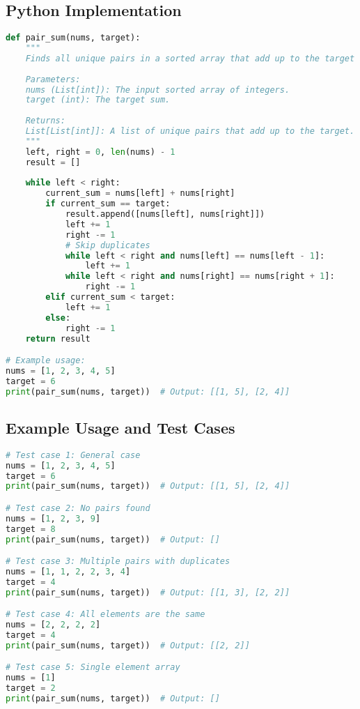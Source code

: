 \subsection*{Python Implementation}
\begin{fullwidth}
\begin{lstlisting}[language=Python]
def pair_sum(nums, target):
    """
    Finds all unique pairs in a sorted array that add up to the target sum.
    
    Parameters:
    nums (List[int]): The input sorted array of integers.
    target (int): The target sum.
    
    Returns:
    List[List[int]]: A list of unique pairs that add up to the target.
    """
    left, right = 0, len(nums) - 1
    result = []
    
    while left < right:
        current_sum = nums[left] + nums[right]
        if current_sum == target:
            result.append([nums[left], nums[right]])
            left += 1
            right -= 1
            # Skip duplicates
            while left < right and nums[left] == nums[left - 1]:
                left += 1
            while left < right and nums[right] == nums[right + 1]:
                right -= 1
        elif current_sum < target:
            left += 1
        else:
            right -= 1
    return result

# Example usage:
nums = [1, 2, 3, 4, 5]
target = 6
print(pair_sum(nums, target))  # Output: [[1, 5], [2, 4]]
\end{lstlisting}
\end{fullwidth}

\subsection*{Example Usage and Test Cases}

\begin{lstlisting}[language=Python]
# Test case 1: General case
nums = [1, 2, 3, 4, 5]
target = 6
print(pair_sum(nums, target))  # Output: [[1, 5], [2, 4]]

# Test case 2: No pairs found
nums = [1, 2, 3, 9]
target = 8
print(pair_sum(nums, target))  # Output: []

# Test case 3: Multiple pairs with duplicates
nums = [1, 1, 2, 2, 3, 4]
target = 4
print(pair_sum(nums, target))  # Output: [[1, 3], [2, 2]]

# Test case 4: All elements are the same
nums = [2, 2, 2, 2]
target = 4
print(pair_sum(nums, target))  # Output: [[2, 2]]

# Test case 5: Single element array
nums = [1]
target = 2
print(pair_sum(nums, target))  # Output: []
\end{lstlisting}

